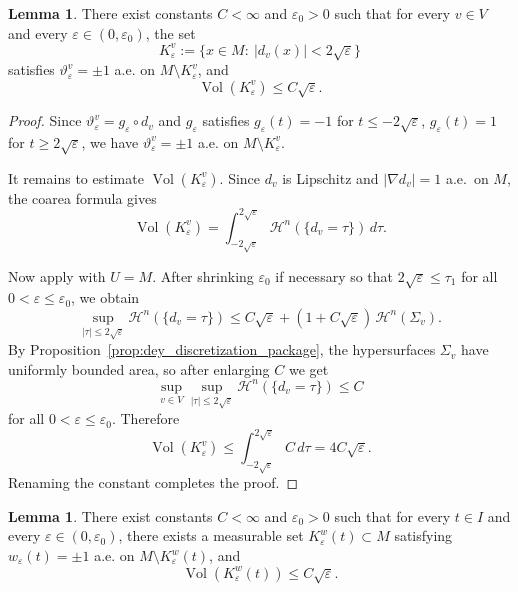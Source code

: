 \documentclass[12pt,english]{article}
\theoremstyle{definition}
\newtheorem{lemma}[theorem]{Lemma}
\begin{document}
\begin{lemma}\label{lem:vertex_transition_set}
There exist constants \(C<\infty\) and \(\varepsilon_0>0\) such that for every \(v\in V\) and every
\(\varepsilon\in(0,\varepsilon_0)\), the set
\[
K_\varepsilon^v:=\{x\in M:\ |d_v(x)|<2\sqrt\varepsilon\}
\]
satisfies $\vartheta_\varepsilon^v=\pm1$ a.e. on $M\setminus K_\varepsilon^v$, and
\[
\operatorname{Vol}(K_\varepsilon^v)\le C\sqrt\varepsilon.
\]
\end{lemma}

\begin{proof}
Since \(\vartheta_\varepsilon^v=g_\varepsilon\circ d_v\) and \(g_\varepsilon\) satisfies $g_\varepsilon(t)=-1$ for $t\le -2\sqrt\varepsilon$, $g_\varepsilon(t)=1$ for $t\ge 2\sqrt\varepsilon$, we have $\vartheta_\varepsilon^v=\pm1$ a.e. on $M\setminus K_\varepsilon^v$.

It remains to estimate \(\operatorname{Vol}(K_\varepsilon^v)\). Since \(d_v\) is Lipschitz and
\(|\nabla d_v|=1\) a.e.\ on \(M\), the coarea formula gives
\[
\operatorname{Vol}(K_\varepsilon^v)
=
\int_{-2\sqrt\varepsilon}^{2\sqrt\varepsilon}\mathcal H^n(\{d_v=\tau\})\,d\tau.
\]

Now apply \cite[(3.68)--(3.69)]{Dey} with \(U=M\). After shrinking \(\varepsilon_0\) if necessary so that
\(2\sqrt\varepsilon\le \tau_1\) for all \(0<\varepsilon\le \varepsilon_0\), we obtain
\[
\sup_{|\tau|\le 2\sqrt\varepsilon}\mathcal H^n(\{d_v=\tau\})
\le
C\sqrt\varepsilon + (1+C\sqrt\varepsilon)\,\mathcal H^n(\Sigma_v).
\]
By Proposition~\ref{prop:dey_discretization_package}, the hypersurfaces \(\Sigma_v\) have uniformly
bounded area, so after enlarging \(C\) we get
\[
\sup_{v\in V}\sup_{|\tau|\le 2\sqrt\varepsilon}\mathcal H^n(\{d_v=\tau\})\le C
\]
for all $0<\varepsilon\le \varepsilon_0$.
Therefore
\[
\operatorname{Vol}(K_\varepsilon^v)
\le
\int_{-2\sqrt\varepsilon}^{2\sqrt\varepsilon} C\,d\tau
=
4C\sqrt\varepsilon.
\]
Renaming the constant completes the proof.
\end{proof}

\begin{lemma}\label{lem:switch_transition_set}
There exist constants \(C<\infty\) and \(\varepsilon_0>0\) such that for every \(t\in I\) and every
\(\varepsilon\in(0,\varepsilon_0)\), there exists a measurable set \(K_\varepsilon^w(t)\subset M\) satisfying $w_\varepsilon(t)=\pm1$ a.e. on $M\setminus K_\varepsilon^w(t)$, and
\[
\operatorname{Vol}(K_\varepsilon^w(t))\le C\sqrt\varepsilon.
\]
\end{lemma}
\end{document}
